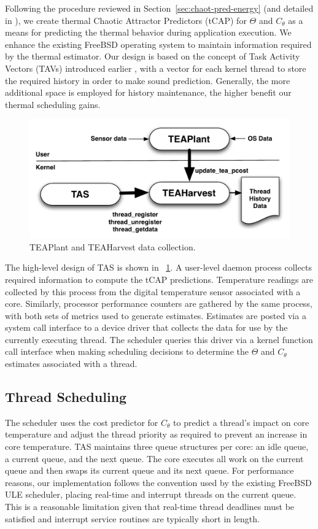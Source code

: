 \documentclass[times, 10pt,twocolumn]{IEEEtran}
\begin{document}
Following the procedure reviewed in Section~\ref{sec:chaot-pred-energy}
(and detailed in \cite{Lewis2010}), we create thermal Chaotic Attractor
Predictors (tCAP) for $\Theta$ and $C_{\theta}$ as a means for
predicting the thermal behavior during application execution.  We
enhance the existing FreeBSD operating system to maintain information
required by the thermal estimator.  Our design is based on the
concept of Task Activity Vectors (TAVs) introduced earlier
\cite{Merkel2008a}, with a vector for each kernel thread to store the
required history in order to make sound prediction.  Generally, the more
additional space is employed for history maintenance, the higher benefit
our thermal scheduling gains.

\begin{figure}[btph] \centering
  \includegraphics[scale=0.45]{tasdesign}
  \caption{TEAPlant and TEAHarvest data collection.}
  \label{fig:teaplant}
\end{figure}
The high-level design of TAS is shown in
\figurename~\ref{fig:teaplant}. A user-level daemon process collects
required information to compute the tCAP predictions. Temperature
readings are collected by this process from the digital temperature
sensor associated with a core.  Similarly, processor performance
counters are gathered by the same process, with both sets of metrics
used to generate estimates. Estimates are posted via a system call
interface to a device driver that collects the data for use by the
currently executing thread.  The scheduler queries this driver via a
kernel function call interface when making scheduling decisions to
determine the $\Theta$ and $C_{\theta}$ estimates associated with a
thread.

\subsection{Thread Scheduling}
\label{sec:selection} 
The scheduler uses the cost predictor for $C_{\theta}$ to predict a
thread's impact on core temperature and adjust the
thread priority as required to prevent an increase in core temperature.
TAS maintains three queue structures per core: an idle queue, a
current queue, and the next queue. The core executes all work on the
current queue and then swaps its current queue and its next queue. For
performance reasons, our implementation follows the convention used by
the existing FreeBSD ULE scheduler, placing real-time and interrupt
threads on the current queue.  This is a reasonable limitation given that
real-time thread deadlines must be satisfied and 
interrupt service routines are typically short in length.
\end{document}

